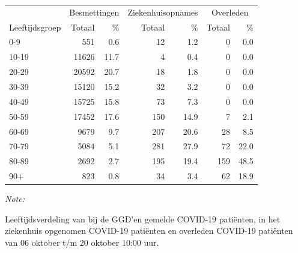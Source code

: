 \documentclass[
  english,
  man,floatsintext]{apa6}
\begin{document}
\begin{table}[H]
\centering\begingroup\fontsize{11}{13}\selectfont

\begin{threeparttable}
\begin{tabular}{lrrrrrr}
\toprule
\multicolumn{1}{c}{ } & \multicolumn{2}{c}{Besmettingen} & \multicolumn{2}{c}{Ziekenhuisopnames} & \multicolumn{2}{c}{Overleden} \\
\cmidrule(l{3pt}r{3pt}){2-3} \cmidrule(l{3pt}r{3pt}){4-5} \cmidrule(l{3pt}r{3pt}){6-7}
Leeftijdsgroep & Totaal & \% & Totaal & \% & Totaal & \%\\
\midrule
0-9 & 551 & 0.6 & 12 & 1.2 & 0 & 0.0\\
10-19 & 11626 & 11.7 & 4 & 0.4 & 0 & 0.0\\
20-29 & 20592 & 20.7 & 18 & 1.8 & 0 & 0.0\\
30-39 & 15120 & 15.2 & 32 & 3.2 & 0 & 0.0\\
40-49 & 15725 & 15.8 & 73 & 7.3 & 0 & 0.0\\
50-59 & 17452 & 17.6 & 150 & 14.9 & 7 & 2.1\\
60-69 & 9679 & 9.7 & 207 & 20.6 & 28 & 8.5\\
70-79 & 5084 & 5.1 & 281 & 27.9 & 72 & 22.0\\
80-89 & 2692 & 2.7 & 195 & 19.4 & 159 & 48.5\\
90+ & 823 & 0.8 & 34 & 3.4 & 62 & 18.9\\
\bottomrule
\end{tabular}
\begin{tablenotes}
\item \textit{Note: } 
\item Leeftijdsverdeling van bij de GGD’en gemelde COVID-19 patiënten, in het ziekenhuis opgenomen COVID-19 patiënten en overleden COVID-19 patiënten van 06 oktober t/m 20 oktober 10:00 uur.
\end{tablenotes}
\end{threeparttable}
\endgroup{}
\end{table}
\end{document}
